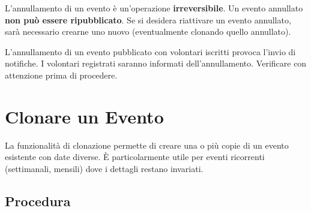 \documentclass[a4paper,11pt,oneside]{book}
\begin{document}
\begin{dangerbox}
L'annullamento di un evento \`e un'operazione \textbf{irreversibile}. Un evento annullato \textbf{non pu\`o essere ripubblicato}. Se si desidera riattivare un evento annullato, sar\`a necessario crearne uno nuovo (eventualmente clonando quello annullato).
\end{dangerbox}

\begin{warningbox}
L'annullamento di un evento pubblicato con volontari iscritti provoca l'invio di notifiche. I volontari registrati saranno informati dell'annullamento. Verificare con attenzione prima di procedere.
\end{warningbox}

\section{Clonare un Evento}
\label{sec:clonare-evento}

La funzionalit\`a di clonazione permette di creare una o pi\`u copie di un evento esistente con date diverse. \`E particolarmente utile per eventi ricorrenti (settimanali, mensili) dove i dettagli restano invariati.

\subsection{Procedura}
\end{document}
